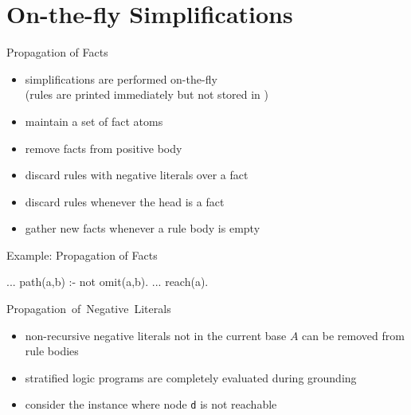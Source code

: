 \section{On-the-fly Simplifications}

\begin{frame}{Propagation of Facts}
  \vfill
  \begin{itemize}
    \item simplifications are performed \alert{on-the-fly}\\
      (rules are printed immediately but not stored in \Gringo)
    \item maintain a set of \alert{fact atoms}
    \item remove facts from positive body
    \item discard rules with negative literals over a fact
    \item discard rules whenever the head is a fact
    \item gather new facts whenever a rule body is empty
  \end{itemize}
\end{frame}

\begin{frame}[fragile]{Example: Propagation of Facts}
  \vfill
  \begin{SemiVerbatim}{.9}
...
path(a,b) :- not omit(a,b).
...
reach(a). {}
\end{SemiVerbatim}
\end{frame}

\begin{frame}{\mbox{Propagation of Negative Literals}}
  \vfill
  \begin{itemize}
    \item \alert{non-recursive negative literals} not in the current base \(A\) can be removed from rule bodies
    \item \alert{stratified} logic programs are \alert{completely evaluated} during grounding
    \item consider the instance where node \texttt{d} is not reachable
  \end{itemize}
  \hspace{1em}
  \begin{center}
    \Graph[draw=none]
  \end{center}
\end{frame}

